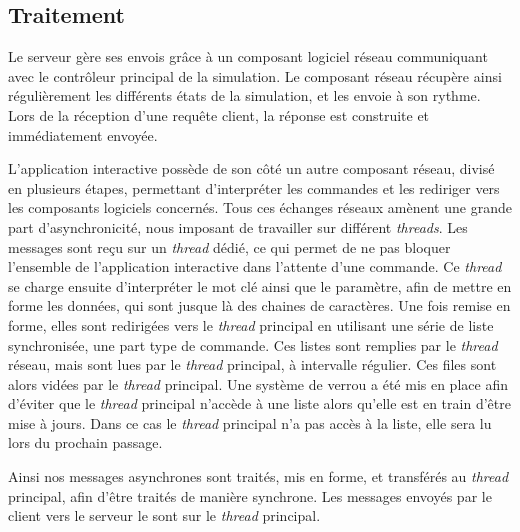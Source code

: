 	\subsection{Traitement}
	Le serveur gère ses envois grâce à un composant logiciel réseau communiquant avec le contrôleur principal de la simulation. Le composant réseau récupère ainsi régulièrement les différents états de la simulation, et les envoie à son rythme. Lors de la réception d'une requête client, la réponse est construite et immédiatement envoyée.
	
	L'application interactive possède de son côté un autre composant réseau, divisé en plusieurs étapes, permettant d'interpréter les commandes et les rediriger vers les composants logiciels concernés. Tous ces échanges réseaux amènent une grande part d'asynchronicité, nous imposant de travailler sur différent \textit{threads}. Les messages sont reçu sur un \textit{thread} dédié, ce qui permet de ne pas bloquer l'ensemble de l'application interactive dans l'attente d'une commande. Ce \textit{thread} se charge ensuite d'interpréter le mot clé ainsi que le paramètre, afin de mettre en forme les données, qui sont jusque là des chaines de caractères. Une fois remise en forme, elles sont redirigées vers le \textit{thread} principal en utilisant une série de liste synchronisée, une part type de commande. Ces listes sont remplies par le \textit{thread} réseau, mais sont lues par le \textit{thread} principal, à intervalle régulier. Ces files sont alors vidées par le \textit{thread} principal. Une système de verrou a été mis en place afin d'éviter que le \textit{thread} principal n'accède à une liste alors qu'elle est en train d'être mise à jours. Dans ce cas le \textit{thread} principal n'a pas accès à la liste, elle sera lu lors du prochain passage.
	
	Ainsi nos messages asynchrones sont traités, mis en forme, et transférés au \textit{thread} principal, afin d'être traités de manière synchrone. Les messages envoyés par le client vers le serveur le sont sur le \textit{thread} principal.
	
